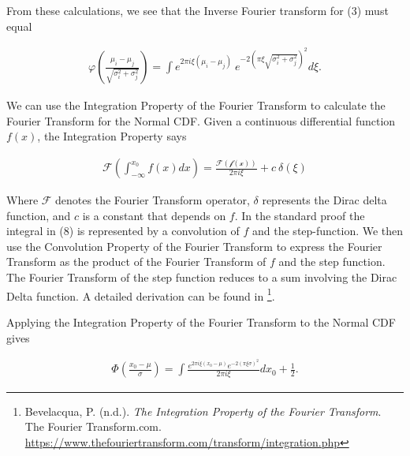 \documentclass[]{article}
\begin{document}
From these calculations, we see that the Inverse Fourier transform for
(3) must equal

\begin{align}
\varphi(\frac{\mu_i - \mu_j}{\sqrt{\sigma_i^2 + \sigma_j^2}}) = \int e^{2 \pi i \xi (\mu_i - \mu_j)}\ e^{-2(\pi \xi \sqrt{\sigma_i^2 + \sigma_j^2})^2} d\xi.
\end{align}

We can use the Integration Property of the Fourier Transform to
calculate the Fourier Transform for the Normal CDF. Given a continuous
differential function \(f (x)\), the Integration Property says

\begin{align}
\mathcal{F} (\int_{-\infty}^{x_0} f (x) dx) = \frac{\mathcal{F (f(x))}}{2 \pi i \xi} + c\ \delta(\xi)
\end{align}

Where \(\mathcal{F}\) denotes the Fourier Transform operator, \(\delta\)
represents the Dirac delta function, and \(c\) is a constant that
depends on \(f\). In the standard proof the integral in (8) is
represented by a convolution of \(f\) and the step-function. We then use
the Convolution Property of the Fourier Transform to express the Fourier
Transform as the product of the Fourier Transform of \(f\) and the step
function. The Fourier Transform of the step function reduces to a sum
involving the Dirac Delta function. A detailed derivation can be found
in \footnote{Bevelacqua, P. (n.d.). \emph{The Integration Property of
  the Fourier Transform}. The Fourier Transform.com.
  \url{https://www.thefouriertransform.com/transform/integration.php}}.

Applying the Integration Property of the Fourier Transform to the Normal
CDF gives

\begin{align}\Phi (\frac{x_0 - \mu}{\sigma}) = \int \frac{e^{2 \pi i \xi (x_0 - \mu)} e^{-2(\pi \xi \sigma)^2}}{2 \pi i \xi} d x_0 + \frac{1}{2}.\end{align}
\end{document}
